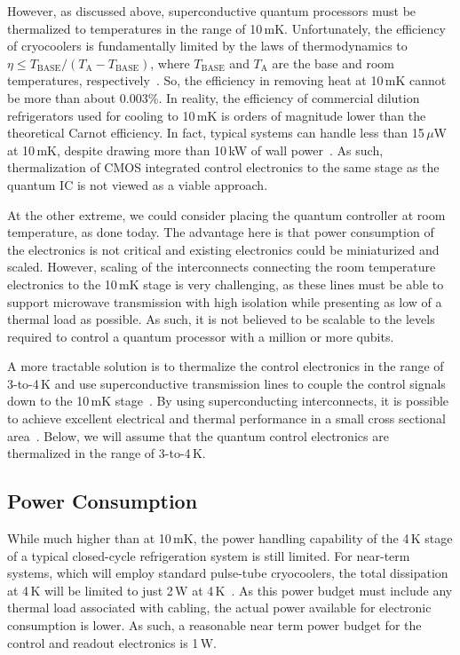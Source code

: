 \documentclass[journal]{IEEEtran}
\begin{document}
However,  as discussed above, superconductive quantum processors must be thermalized to temperatures in the range of 10\,mK. Unfortunately, the efficiency of cryocoolers is fundamentally limited by the laws of  thermodynamics to $\eta\le{}T_\text{BASE}/\left(T_\text{A}-T_\text{BASE}\right)$, where $T_\text{BASE}$ and $T_\text{A}$ are the base and room temperatures, respectively~\cite{kittel1969thermal}. So, the efficiency in removing heat at 10\,mK cannot be more than about 0.003\%. In reality, the efficiency of commercial dilution refrigerators used for cooling to 10\,mK is orders of magnitude lower than the theoretical Carnot efficiency. In fact, typical systems can handle less than 15$\,\mu$W at 10\,mK, despite drawing more than 10\,kW of wall power~\cite{oxford,pt420}. As such, thermalization of CMOS integrated control electronics to the same stage as the quantum IC is not viewed as a viable approach.

At the other extreme, we could consider placing the quantum controller at room temperature, as done today. The advantage here is that power consumption of the electronics is not critical and existing electronics could be miniaturized and scaled. However, scaling of the interconnects connecting the room temperature electronics to the 10\,mK stage is very challenging, as these lines must be able to support microwave transmission with high isolation while presenting as low of a thermal load as possible. As such, it is not believed to be scalable to the levels required to control a quantum processor with a million or more qubits. 
 
A more tractable solution is to thermalize the control electronics in the range of 3-to-4\,K and use superconductive transmission lines to couple the control signals down to the 10\,mK stage~\cite{ hornibrook2015cryogenic,CharbonISSCC}. By using superconducting interconnects, it is possible to achieve excellent electrical and thermal performance in a small cross sectional area~\cite{tuckerman2016flexible}. Below, we will assume that the quantum control electronics are thermalized in the range of 3-to-4\,K.
\subsection{Power Consumption}
While much higher than at 10\,mK, the power handling capability of the 4\,K stage of a typical closed-cycle refrigeration system is still limited.  For near-term systems, which will employ standard pulse-tube cryocoolers, the total dissipation at 4\,K will be limited to just 2\,W at 4\,K~\cite{cryomech}. As this power budget must include any thermal load associated with cabling, the actual power available for electronic consumption is lower. As such, a reasonable near term power budget for the control and readout electronics is 1\,W.
\end{document}
